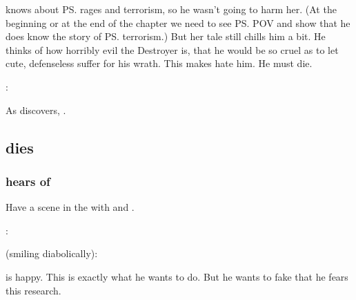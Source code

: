 \Teshrial{} knows about \ps{\Ishnaruchaefir} rages and terrorism, so he wasn't going to harm her. 
(At the beginning or at the end of the chapter we need to see \ps{\Teshrial} POV and show that he does know the story of \ps{\Ishnaruchaefir} terrorism.)
But her tale still chills him a bit. 
He thinks of how horribly evil the Destroyer is, that he would be so cruel as to let cute, defenseless \humans{} suffer for his wrath. 
This makes \Teshrial{} hate him.
He must die. 

\begin{prose}
  \Teshrial: 
\end{prose}


As \Teshrial{} discovers, \Ishnaruchaefir{} . 









\subsection{\Urizeth dies}





\subsubsection{\Ishnaruchaefir{} hears of \Urizeth}
Have a scene in the  with \Criseis{} and \Ishnaruchaefir. 

\begin{prose}
  \Criseis:
  
  \Ishnaruchaefir{} (smiling diabolically): 
\end{prose}

\Ishnaruchaefir{} is happy. 
This is exactly what he wants \Teshrial{} to do. 
But he wants to fake that he fears this research. 






